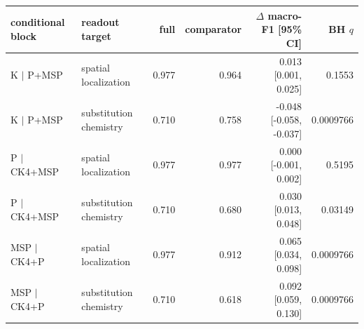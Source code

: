 \begin{tabular}{@{}llrrrr@{}}
\toprule
\textbf{conditional block} & \textbf{readout target} & \textbf{full} & \textbf{comparator} & \textbf{$\Delta$ macro-F1 [95\% CI]} & \textbf{BH $q$} \\
\midrule
K $\mid$ P+MSP & spatial localization & 0.977 & 0.964 & 0.013 [0.001, 0.025] & 0.1553 \\
K $\mid$ P+MSP & substitution chemistry & 0.710 & 0.758 & -0.048 [-0.058, -0.037] & 0.0009766 \\
P $\mid$ CK4+MSP & spatial localization & 0.977 & 0.977 & 0.000 [-0.001, 0.002] & 0.5195 \\
P $\mid$ CK4+MSP & substitution chemistry & 0.710 & 0.680 & 0.030 [0.013, 0.048] & 0.03149 \\
MSP $\mid$ CK4+P & spatial localization & 0.977 & 0.912 & 0.065 [0.034, 0.098] & 0.0009766 \\
MSP $\mid$ CK4+P & substitution chemistry & 0.710 & 0.618 & 0.092 [0.059, 0.130] & 0.0009766 \\
\bottomrule
\end{tabular}
